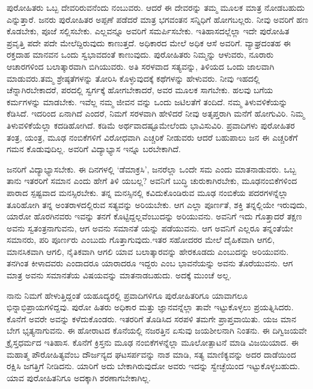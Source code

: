 ಪುರೋಹಿತರು ಒಬ್ಬ ದೇವರಿರುವನೆಂದು ನಂಬುವರು. ಆದರೆ ಈ ದೇವರನ್ನು ತಮ್ಮ ಮೂಲಕ ಮಾತ್ರ ನೋಡಬಹುದು ಎನ್ನುತ್ತಾರೆ. ಜನರು ಪುರೋಹಿತರ ಅಪ್ಪಣೆ ಪಡೆದರೆ ಮಾತ್ರ ಭಗವಂತನ ಸನ್ನಿಧಿಗೆ ಹೋಗಬಲ್ಲರು. ನೀವು ಅವರಿಗೆ ಹಣ ಕೊಡಬೇಕು, ಪೂಜೆ ಸಲ್ಲಿಸಬೇಕು. ಎಲ್ಲವನ್ನೂ ಅವರಿಗೆ ಸಮರ್ಪಿಸಬೇಕು. ಇತಿಹಾಸದಲ್ಲೆಲ್ಲಾ ಇದೇ ಪುರೋಹಿತ ಪ್ರವೃತ್ತಿ ಪದೇ ಪದೇ ಮೇಲೆದ್ದಿರುವುದು ಕಾಣುತ್ತದೆ. ಅಧಿಕಾರದ ಮೇಲೆ ಅಧಿಕ ಆಸೆ ಅವರಿಗೆ. ವ್ಯಾಘ್ರದಂತಹ ಈ ರಕ್ತದಾಹ ಮಾನವನ ಒಂದು ಸ್ವಭಾವದಂತೆ ಕಾಣುವುದು. ಪುರೋಹಿತರು ನಿಮ್ಮನ್ನು ಆಳುವರು, ನೂರಾರು ಆಚಾರಗಳಿಂದ ಬಲಾತ್ಕಾರವಾಗಿ ಬಿಗಿಯುವರು. ಅತಿ ಸರಳವಾದ ಸತ್ಯವನ್ನು, ತಿಳಿಯದ ಒಂದು ಜಾಲವಾಗಿ ಮಾಡುವರು.ತಮ್ಮ ಶ್ರೇಷ್ಠತೆಗಳನ್ನು ತೋರಿಸಿ ಕೊಳ್ಳುವುದಕ್ಕೆ ಕಥೆಗಳನ್ನು ಹೇಳುವರು. ನೀವು ಇಹದಲ್ಲಿ ಚೆನ್ನಾಗಿರಬೇಕಾದರೆ, ಪರದಲ್ಲಿ ಸ್ವರ್ಗಕ್ಕೆ ಹೋಗಬೇಕಾದರೆ, ಅವರ ಮೂಲಕ ಸಾಗಬೇಕು. ಹಲವು ಬಗೆಯ ಕರ್ಮಗಳನ್ನು ಮಾಡಬೇಕು. ಇವೆಲ್ಲ ನಮ್ಮ ಜೀವನ ವನ್ನು ಒಂದು ಜಟಿಲತೆಗೆ ತಂದಿದೆ. ನಮ್ಮ ತಿಳುವಳಿಕೆಯನ್ನು ಕೆಡಿಸಿದೆ. ಇದರಿಂದ ಏನಾಗಿದೆ ಎಂದರೆ, ನಿಮಗೆ ಸರಳವಾಗಿ ಹೇಳಿದರೆ ನೀವು ಅತೃಪ್ತರಾಗಿ ಮನೆಗೆ ಹೋಗುವಿರಿ. ನಿಮ್ಮ ತಿಳುವಳಿಕೆಯೆಲ್ಲಾ ಕದಡಿಹೋಗಿದೆ. ಕಡಿಮೆ ಅರ್ಥವಾದಷ್ಟೂಮೇಲೆಂದು ಭಾವಿಸುವಿರಿ. ಪ್ರವಾದಿಗಳು ಪುರೋಹಿತರ ತಂತ್ರ, ಯಂತ್ರ, ಮೂಢ ನಂಬಿಕೆಗಳಿಗೆ ವಿರೋಧವಾಗಿ ಎಚ್ಚರಿಕೆ ನೀಡುವರು ಆದರೆ ಬಹುಪಾಲು ಜನ ಈ ಎಚ್ಚರಿಕೆಗೆ ಗಮನ ಕೊಡುವುದಿಲ್ಲ. ಅವರಿಗೆ ವಿದ್ಯಾಭ್ಯಾಸ ಇನ್ನೂ ಬರಬೇಕಾಗಿದೆ.

ಜನರಿಗೆ ವಿದ್ಯಾಭ್ಯಾಸಬೇಕು. ಈ ದಿನಗಳಲ್ಲಿ ‘ಡೆಮಾಕ್ರಸಿ’, ಜನರೆಲ್ಲಾ ಒಂದೇ ಸಮ ಎಂದು ಮಾತನಾಡುವರು. ಒಬ್ಬ ತಾನು ಇತರರಿಗೆ ಸಮಾನ ಎಂದು ಹೇಗೆ ತಿಳಿ ಯಬಲ್ಲ? ಅವನಿಗೆ ಬುದ್ಧಿ ಚುರುಕಾಗಿರಬೇಕು, ಮೂಢನಂಬಿಕೆಗಳಿಂದ ಪಾರಾದ ಸ್ಪಷ್ಟವಾದ ಮನಸ್ಸಿರಬೇಕು. ತನ್ನ ಮನಸ್ಸಿನಲ್ಲಿ ಕವಿದುಕೊಂಡಿರುವ ಮೂಢ ನಂಬಿಕೆಯ ಪದರಗಳನ್ನೆಲ್ಲಾ ತೂರಿಹೋಗಿ ತನ್ನ ಅಂತರಾಳದಲ್ಲಿರುವ ಸತ್ಯವನ್ನು ಅರಿಯಬೇಕು. ಆಗ ಎಲ್ಲಾ ಪೂರ್ಣತೆ, ಶಕ್ತಿ ತನ್ನಲ್ಲಿಯೇ ಇರುವುದು, ಯಾರೋ ಹೊರಗಿನವರು ಇವನ್ನು ತನಗೆ ಕೊಟ್ಟಿದ್ದಲ್ಲವೆಂಬುದನ್ನು ಅರಿಯುವನು. ಅವನಿಗೆ ಇದು ಗೊತ್ತಾದರೆ ತಕ್ಷಣ ಅವನು ಸ್ವತಂತ್ರನಾಗುವನು, ಆಗ ಅವನು ಸಮಾನತೆ ಯನ್ನು ಪಡೆಯುವನು. ಆಗ ಅವನಿಗೆ ಎಲ್ಲರೂ ತನ್ನಂತೆಯೇ ಸಮಾನರು, ಪರಿ ಪೂರ್ಣರು ಎಂಬುದು ಗೊತ್ತಾಗುವುದು.ಇತರ ಸಹೋದರರ ಮೇಲೆ ದೈಹಿಕವಾಗಿ ಆಗಲಿ, ಮಾನಸಿಕವಾಗಿ ಆಗಲಿ, ನೈತಿಕವಾಗಿ ಆಗಲಿ ಯಾವ ಬಲಾತ್ಕಾರವನ್ನು ಹೇರಕೂಡದು ಎಂಬುದನ್ನು ಅರಿಯುವನು. ತನಗಿಂತ ಕೀಳಾದವರು ಎಂದಾದರೂ ಯಾರಾದರೂ ಇದ್ದರು ಎಂಬ ಭಾವನೆಯನ್ನು ಅವನು ತೊರೆಯುವನು. ಆಗ ಮಾತ್ರ ಅವನು ಸಮಾನತೆಯ ವಿಷಯವನ್ನು ಮಾತನಾಡಬಹುದು. ಅದಕ್ಕೆ ಮುಂಚೆ ಅಲ್ಲ.

ನಾನು ನಿಮಗೆ ಹೇಳುತ್ತಿದ್ದಂತೆ ಯಹೂದ್ಯರಲ್ಲಿ ಪ್ರವಾದಿಗಳಿಗೂ ಪುರೋಹಿತರಿಗೂ ಯಾವಾಗಲೂ ಭಿನ್ನಾಭಿಪ್ರಾಯಗಳಿದ್ದವು. ಪುರೋ ಹಿತರು ಅಧಿಕಾರ ಮತ್ತು ಜ್ಞಾನವನ್ನೆಲ್ಲಾ ತಾವೇ ಇಟ್ಟುಕೊಳ್ಳಲು ಪ್ರಯತ್ನಿಸಿದರು. ಕೊನೆಗೆ ಅವರೇ ಅವನ್ನು ಕಳೆದುಕೊಂಡರು. ಇತರರಿಗೆ ತೊಡಿಸಿದ ಸರಪಳಿ ತಮಗೇ ಪ್ರಾಪ್ತವಾಯಿತು. ಯಜ ಮಾನ ಬೇಗ ಭೃತ್ಯನಾಗುವನು. ಈ ಹೋರಾಟದ ಕೊನೆಯಲ್ಲಿ ನಜರತ್ತಿನ ಏಸುವು ಜಯಶೀಲನಾಗಿ ನಿಂತನು. ಈ ದಿಗ್ವಿಜಯವೇ ಕ್ರೈಸ್ತಧರ್ಮದ ಇತಿಹಾಸ. ಕೊನೆಗೆ ಕ್ರಿಸ್ತನು ಮೂಢ ನಂಬಿಕೆಗಳನ್ನೆಲ್ಲಾ ಮೂಲೋತ್ಪಾಟನೆ ಮಾಡಿ ವಿಜಯಿಯಾದ. ಈ ಮಹಾತ್ಮ ಪೌರೋಹಿತ್ಯವೆಂಬ ದೌರ್ಜನ್ಯದ ಘಟಸರ್ಪವನ್ನು ನಾಶ ಮಾಡಿ, ಸತ್ಯ ಮಾಣಿಕ್ಯವನ್ನು ಅದರ ದಾಡೆಯಿಂದ ರಕ್ಷಿಸಿ ಜಗತ್ತಿಗೆ ನೀಡಿದನು. ಯಾರಿಗೆ ಅದು ಬೇಕಾಗಿರುವುದೋ ಅವರು ಇದನ್ನು ಸ್ವೇಚ್ಛೆಯಿಂದ ಇಟ್ಟುಕೊಳ್ಳಬಹುದು. ಯಾವ ಪುರೋಹಿತನಿಗೂ ಅದಕ್ಕಾಗಿ ಶರಣಾಗಬೇಕಾಗಿಲ್ಲ.

